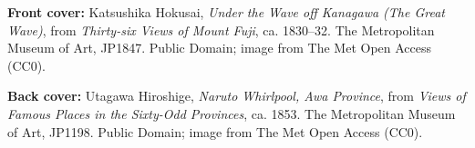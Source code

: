 \noindent\textbf{Front cover:} Katsushika Hokusai,
\textit{Under the Wave off Kanagawa (The Great Wave)}, from
\textit{Thirty-six Views of Mount Fuji}, ca. 1830--32. The Metropolitan Museum
of Art, JP1847. Public Domain; image from The Met Open Access (CC0).

\par\smallskip
\noindent\textbf{Back cover:} Utagawa Hiroshige,
\textit{Naruto Whirlpool, Awa Province}, from
\textit{Views of Famous Places in the Sixty-Odd Provinces}, ca. 1853. The
Metropolitan Museum of Art, JP1198. Public Domain; image from The Met Open Access (CC0).
